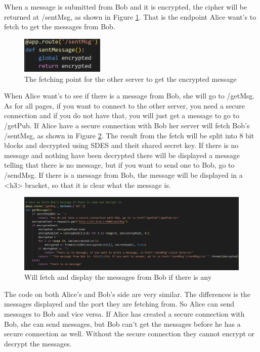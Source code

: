 \documentclass[12pt, letterpaper]{article}
\begin{document}
When a message is submitted from Bob and it is encrypted, the cipher will be returned at /sentMsg, as shown in Figure \ref{fig:sentMsg}. That is the endpoint Alice want's to fetch to get the messages from Bob.

\begin{figure}[H]
  \includegraphics[width=150px]{code_snippets/sentMsg.PNG}\centering
  \caption{The fetching point for the other server to get the encrypted message}
  \label{fig:sentMsg}
\end{figure}

When Alice want's to see if there is a message from Bob, she will go to /getMsg. As for all pages, if you want to connect to the other server, you need a secure connection and if you do not have that, you will just get a message to go to /getPub. If Alice have a secure connection with Bob her server will fetch Bob's /sentMsg, as shown in Figure \ref{fig:getMsg}. The result from the fetch will be split into 8 bit blocks and decrypted using SDES and theit shared secret key. If there is no message and nothing have been decrypted there will be displayed a message telling that there is no message, but if you want to send one to Bob, go to /sendMsg. If there is a message from Bob, the message will be displayed in a <h3> bracket, so that it is clear what the message is. 

\begin{figure}[H]
  \hspace*{-50px}\includegraphics[width=500px]{code_snippets/getMsg.PNG}
  \caption{Will fetch and display the messages from Bob if there is any}
  \label{fig:getMsg}
\end{figure}

The code on both Alice's and Bob's side are very similar. The differences is the messages displayed and the port they are fetching from. So Alice can send messages to Bob and vice versa. If Alice has created a secure connection with Bob, she can send messages, but Bob can't get the messages before he has a secure connection as well. Without the secure connection they cannot encrypt or decrypt the messages. 
\end{document}
